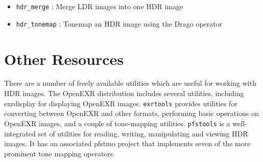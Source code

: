 \begin{itemize}
\item \verb#hdr_merge#   : Merge LDR images into one HDR image
\item \verb#hdr_tonemap# : Tonemap an HDR image using the Drago operator
\end{itemize}

\section{Other Resources}
There are a number of freely available utilities which are useful for
working with HDR images. The OpenEXR distribution \cite{openexr}
includes several utilities, including exrdisplay for displaying
OpenEXR images. {\tt exrtools} \cite{exrtools} provides utilities for
converting between OpenEXR and other formats, performing basic
operations on OpenEXR images, and a couple of tone-mapping
utilities. {\tt pfstools} \cite{pfstools} is a well-integrated set of
utilities for reading, writing, manipulating and viewing HDR images.
It has an associated pfstmo project that implements seven of the more
prominent tone mapping operators.

\begin{verbatim}
\end{verbatim}

